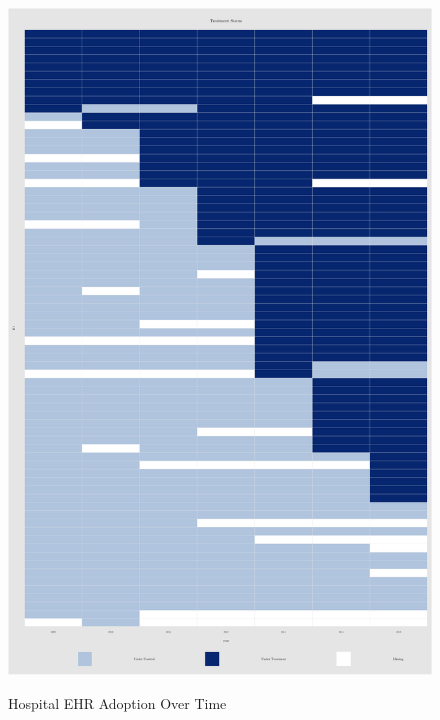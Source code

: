 \documentclass[11pt]{article}
\begin{document}
\begin{figure}
    \centering
    \caption{Hospital EHR Adoption Over Time}
    \includegraphics[scale=.6]{Objects/hosp_treat.png}
    \label{fig:hosp_treat}
\end{figure}
\end{document}
